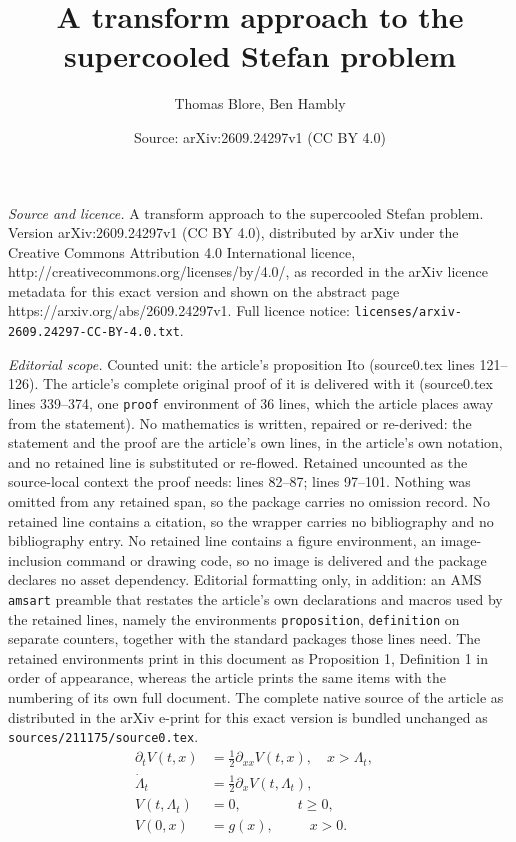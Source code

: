 \documentclass[10pt,a4paper]{amsart}
\title{A transform approach to the supercooled Stefan problem}
\author{Thomas Blore, Ben Hambly}
\date{Source: arXiv:2609.24297v1 (CC BY 4.0)}
\begin{document}
\maketitle

\noindent\emph{Source and licence.} A transform approach to the supercooled Stefan problem. Version arXiv:2609.24297v1 (CC BY 4.0), distributed by arXiv under the Creative Commons Attribution 4.0 International licence, http://creativecommons.org/licenses/by/4.0/, as recorded in the arXiv licence metadata for this exact version and shown on the abstract page https://arxiv.org/abs/2609.24297v1. Full licence notice: \texttt{licenses/arxiv-2609.24297-CC-BY-4.0.txt}.\par\smallskip

\noindent\textit{Editorial scope.} Counted unit: the article's proposition Ito (source0.tex lines 121--126). The article's complete original proof of it is delivered with it (source0.tex lines 339--374, one \texttt{proof} environment of 36 lines, which the article places away from the statement). No mathematics is written, repaired or re-derived: the statement and the proof are the article's own lines, in the article's own notation, and no retained line is substituted or re-flowed.  Retained uncounted as the source-local context the proof needs: lines 82--87; lines 97--101.  Nothing was omitted from any retained span, so the package carries no omission record.  No retained line contains a citation, so the wrapper carries no bibliography and no bibliography entry.  No retained line contains a figure environment, an image-inclusion command or drawing code, so no image is delivered and the package declares no asset dependency.  Editorial formatting only, in addition: an AMS \texttt{amsart} preamble that restates the article's own declarations and macros used by the retained lines, namely the environments \texttt{proposition}, \texttt{definition} on separate counters, together with the standard packages those lines need.  The retained environments print in this document as Proposition 1, Definition 1 in order of appearance, whereas the article prints the same items with the numbering of its own full document.  The complete native source of the article as distributed in the arXiv e-print for this exact version is bundled unchanged as \texttt{sources/211175/source0.tex}.
\begin{align}
    \partial_t V(t,x) &=\frac{1}{2}\partial_{xx} V(t,x), \quad x>\Lambda_t,\nonumber\\
     \dot{\Lambda}_t &=\frac{1}{2}\partial_x V(t,\Lambda_t),\label{pde}\\
    V(t,\Lambda_t) &=0, \qquad\qquad t\geq 0, &\nonumber\\
    V(0,x) &=g(x),\qquad\;\; x>0.\nonumber
\end{align}
\end{document}
